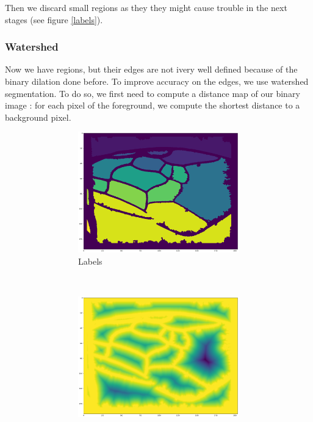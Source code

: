 \documentclass[a4paper]{article}
\begin{document}
Then we discard small regions as they they might cause trouble in the next stages (see figure \ref{labels}).

\subsubsection{Watershed}

Now we have regions, but their edges are not ivery well defined because of the binary dilation done before. To improve accuracy on the edges, we use watershed segmentation. To do so, we first need to compute a distance map of our binary image : for each pixel of the foreground, we compute the shortest distance to a background pixel.  

\begin{figure}[h]
\begin{subfigure}{.4\textwidth}
  \centering
    \begin{subfigure}{\textwidth}
    \centering
        \includegraphics[width=\linewidth]{figures/markers2.png}
        \caption{Labels}
    \end{subfigure}\\
    \begin{subfigure}{\textwidth}
    \centering
        \includegraphics[width=\linewidth]{figures/distances.png}

\end{subfigure}
\end{subfigure}
\end{figure}
\end{document}
